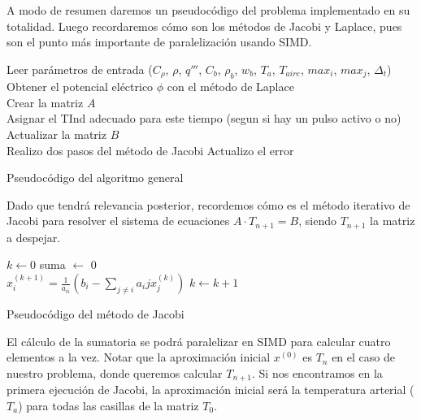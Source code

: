 \documentclass[a4paper]{article}
\begin{document}
A modo de resumen daremos un pseudocódigo del problema implementado en 
su totalidad. Luego recordaremos cómo son los métodos de Jacobi y 
Laplace, pues son el punto más importante de paralelización usando SIMD.\\

\begin{algorithm}[H]
Leer par\'ametros de entrada ($C_{\rho}$, $\rho$, $q'''$, $C_b$, $\rho_b$, $w_b$, $T_a$, $T_{aire}$, $max_i$, $max_j$, $\Delta_t$) \\
Obtener el potencial el\'ectrico $\phi$ con el método de Laplace \\
Crear la matriz $A$ \\

 {
	Asignar el TInd adecuado para este tiempo (segun si hay un pulso activo o no)\\
	Actualizar la matriz $B$ \\
	 {
		Realizo dos pasos del método de Jacobi
		Actualizo el error
	}
}
\caption{Pseudocódigo del algoritmo general}
\end{algorithm}

\bigskip

Dado que tendrá relevancia posterior, recordemos cómo es el método 
iterativo de Jacobi para resolver el sistema de ecuaciones 
$A \cdot T_{n+1} = B$, siendo $T_{n+1}$ la matriz a despejar.\\

\begin{algorithm}[H]

$k \leftarrow 0$
 {
	suma $\leftarrow$ 0 \\
	 {
		$x_i^{(k+1)} = \frac{1}{a_{ii}}(b_i - \sum_{j \neq i} {a_ij x_j^{(k)}})$
	}
	$k \leftarrow k + 1$
}
\caption{Pseudocódigo del método de Jacobi}
\end{algorithm}

\bigskip

El cálculo de la sumatoria se podrá paralelizar en SIMD para calcular 
cuatro elementos a la vez. Notar que la aproximación inicial $x^{(0)}$ 
es $T_n$ en el caso de nuestro problema, donde queremos calcular $T_{n+1}$. 
Si nos encontramos en la primera ejecución de Jacobi, la aproximación 
inicial será la temperatura arterial ($T_a$) para todas las casillas 
de la matriz $T_0$. \\
\end{document}
